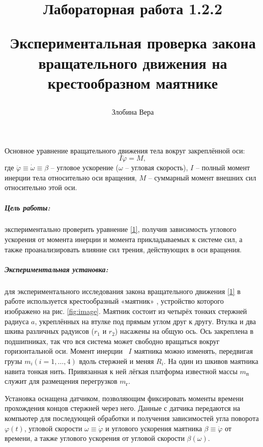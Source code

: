 \documentclass[a4paper,12pt]{article}
\author{Злобина Вера}
\title{Лабораторная работа 1.2.2

Экспериментальная проверка закона вращательного движения на крестообразном маятнике}
\begin{document}
 	
	
\maketitle

\newpage

Основное уравнение вращательного движения тела вокруг закреплённой оси:
\begin{equation}\label{1}
I \ddot{\varphi} = M, 
\end{equation}
где $\ddot{\varphi} \equiv \dot{\omega} \equiv \beta$ -- угловое ускорение ($\omega$  -- угловая скорость), $I$ -- полный момент инерции тела относительно оси вращения, $M$ -- суммарный момент внешних сил относительно этой оси.

\subparagraph*{Цель работы:} экспериментально проверить уравнение \eqref{1}, получив зависимость углового ускорения от момента инерции и момента прикладываемых к системе сил, а также проанализировать влияние сил трения, действующих в оси вращения.
\subparagraph*{Экспериментальная установка:} для экспериментального исследования закона вращательного движения \eqref{1} в работе используется крестообразный «маятник» ,  устройство которого изображено на рис. \ref{fig:image}. Маятник состоит из четырёх тонких стержней радиуса $a$, укреплённых на втулке под прямым углом друг к другу. Втулка и два шкива различных радуисов  ($r_1$ и $r_2$) насажены на общую ось. Ось закреплена в подшипниках, так что вся система может свободно вращаться вокруг горизонтальной оси. Момент инерции  $I$ маятника можно изменять, передвигая грузы $m_i (i = 1, \dots, 4)$ вдоль стержней и меняя $R_i$. На один из шкивов маятника навита тонкая нить. Привязанная к ней лёгкая платформа известной массы $m_п$ служит для размещения перегрузков $m_г$. 

Установка оснащена датчиком, позволяющим фиксировать моменты времени прохождения концов стержней через него. Данные с датчика передаются на компьютер для последующей обработки и получения зависимостей угла поворота $\varphi(t)$, угловой скорости $\omega \equiv \dot{\varphi}$ и углового ускорения маятника $\beta \equiv \ddot{\varphi}$ от времени, а также углового ускорения от угловой скорости $\beta(\omega)$.
\end{document}
